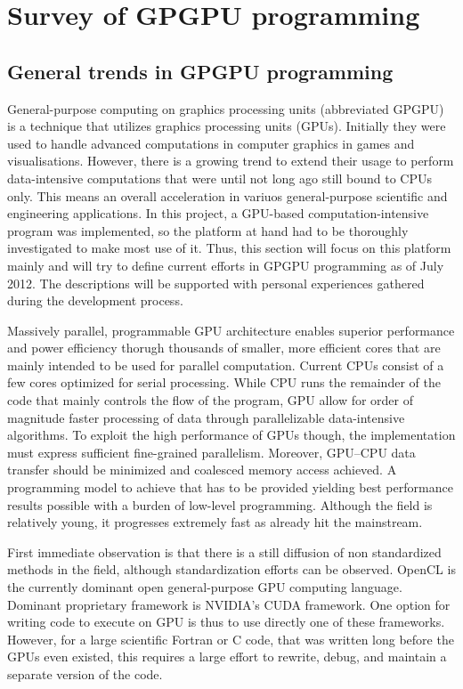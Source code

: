 \chapter{Survey of GPGPU programming}
\section{General trends in GPGPU programming}
General-purpose computing on graphics processing units (abbreviated GPGPU) is a technique that utilizes graphics processing units (GPUs). Initially they were used to handle advanced computations in computer graphics in games and visualisations. However, there is a growing trend to extend their usage to perform data-intensive computations that were until not long ago still bound to CPUs only. This means an overall acceleration in variuos general-purpose scientific and engineering applications. In this project, a GPU-based computation-intensive program was implemented, so the platform at hand had to be thoroughly investigated to make most use of it. Thus, this section will focus on this platform mainly and will try to define current efforts in GPGPU programming as of July 2012. The descriptions will be supported with personal experiences gathered during the development process.

Massively parallel, programmable GPU architecture enables superior performance and power efficiency thorugh thousands of smaller, more efficient cores that are mainly intended to be used for parallel computation. Current CPUs consist of a few cores optimized for serial processing. While CPU runs the remainder of the code that mainly controls the flow of the program, GPU allow for order of magnitude faster processing of data through parallelizable data-intensive algorithms. To exploit the high performance of GPUs though, the implementation must express sufficient fine-grained parallelism. Moreover, GPU–CPU data transfer should be minimized and coalesced memory access achieved. A programming model to achieve that has to be provided yielding best performance results possible with a burden of low-level programming. Although the field is relatively young, it progresses extremely fast as already hit the mainstream.


First immediate observation is that there is a still diffusion of non standardized methods in the field, although standardization efforts can be observed. OpenCL is the currently dominant open general-purpose GPU computing language. Dominant proprietary framework is NVIDIA's CUDA framework. One option for writing code to execute on GPU is thus to use directly one of these frameworks. However, for a large scientific Fortran or C code, that was written long before the GPUs even existed, this requires a large effort to rewrite, debug, and maintain a separate version of the code.

